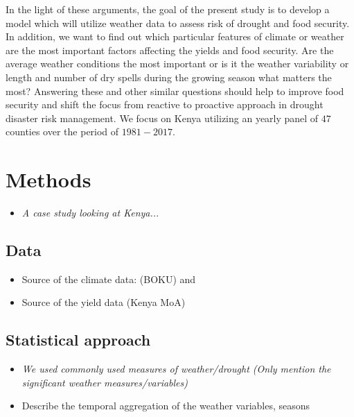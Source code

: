 \documentclass[a4paper,12pt]{article}
\begin{document}
\begin{itemize}
\begin{itemize}
In the light of these arguments, the goal of the present study is to develop a model which will utilize weather data to assess risk of drought and food security. In addition, we want to find out which particular features of climate or weather are the most important factors affecting the yields and food security. Are the average weather conditions the most important or is it the weather variability or length and number of dry spells during the growing season what matters the most? Answering these and other similar questions should help to improve food security and shift the focus from reactive to proactive approach in drought disaster risk management. We focus on Kenya utilizing an yearly panel of $47$ counties over the period of $1981-2017$. %
\color{black}
\end{itemize}
 
\end{itemize}
\section{Methods}\label{Methods}
\color{blue}

\begin{itemize}
\item \textit{A case study looking at Kenya...}
\end{itemize}

\subsection{Data}\label{Data}
\begin{itemize}
\item Source of the climate data: \cite{BOKU} (BOKU) and \cite{Berkeley}
\item Source of the yield data (Kenya MoA)
\end{itemize}

\color{black}
\subsection{Statistical approach}



\begin{itemize}
\color{blue}
\item \textit{We used commonly used measures of weather/drought (Only mention the significant weather measures/variables)}

\item Describe the temporal aggregation of the weather variables, seasons
\end{itemize}
\color{black}
\end{document}
